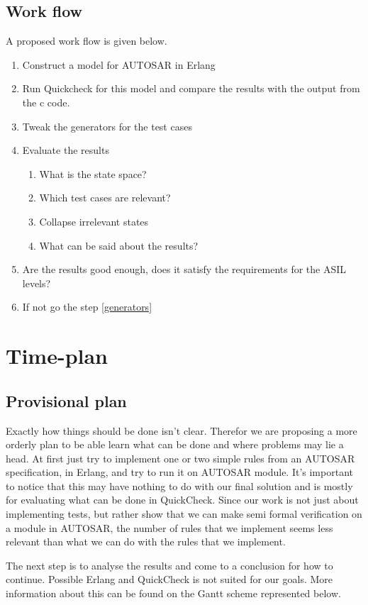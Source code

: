\documentclass[11pt,a4paper]{report}
\begin{document}
\section{Work flow}
A proposed work flow is given below.

\begin{enumerate}
\item Construct a model for AUTOSAR in Erlang
\item Run Quickcheck for this model and compare the results with the output from
the c code.
\item Tweak the generators for the test cases \label{generators}
    \item Evaluate the results
    \begin{enumerate}
      \item What is the state space?
      \item Which test cases are relevant?
      \item Collapse irrelevant states
      \item What can be said about the results?
    \end{enumerate}
\item Are the results good enough, does it satisfy the requirements for the ASIL
levels?
\item If not go the step \ref{generators}
\end{enumerate}

\chapter{Time-plan}
\section{Provisional plan}
Exactly how things should be done isn't clear. Therefor we are proposing a more
orderly plan to be able learn what can be done and where problems may lie a
head. At first just try to implement one or two simple rules from an AUTOSAR
specification, in Erlang, and try to run it on AUTOSAR module. It's important to
notice that this may have nothing to do with our final solution and is mostly
for evaluating what can be done in QuickCheck. Since our work is not just about
implementing tests, but rather show that we can make semi formal verification on
a module in AUTOSAR, the number of rules that we implement seems less relevant
than what we can do with the rules that we implement.

The next step is to analyse the results and come to a conclusion for how to
continue. Possible Erlang and QuickCheck is not suited for our goals.
More information about this can be found on the Gantt scheme
represented below.
\end{document}
